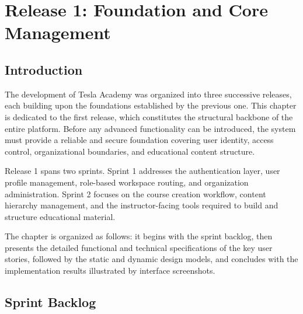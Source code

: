  
\begingroup
\renewcommand{\baselinestretch}{0.85}
\chapter{Release 1: Foundation and Core Management}
\minitoc
\endgroup
\newpage

\section*{Introduction}

The development of Tesla Academy was organized into three successive releases, each
building upon the foundations established by the previous one. This chapter is dedicated
to the first release, which constitutes the structural backbone of the entire platform.
Before any advanced functionality can be introduced, the system must provide a reliable
and secure foundation covering user identity, access control, organizational boundaries,
and educational content structure.

Release 1 spans two sprints. Sprint 1 addresses the authentication layer, user profile
management, role-based workspace routing, and organization administration. Sprint 2
focuses on the course creation workflow, content hierarchy management, and the
instructor-facing tools required to build and structure educational material.

The chapter is organized as follows: it begins with the sprint backlog, then presents
the detailed functional and technical specifications of the key user stories, followed by
the static and dynamic design models, and concludes with the implementation results
illustrated by interface screenshots.

\section{Sprint Backlog}

